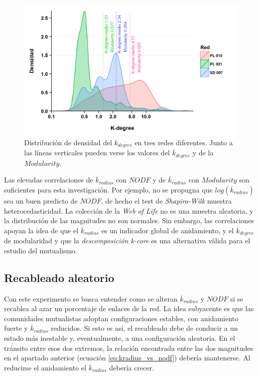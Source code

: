 \begin{figure}[h!]
\centering
\includegraphics[scale=0.85]{ESTATICA_density_plots.png}
\caption {Distribución de densidad del $k_{degree}$ en tres redes diferentes. Junto a las líneas verticales pueden verse los valores del $\overline {k}_{degree}$ y de la $Modularity$.}
\label{fig:ESTATICA_density_plots}
\end{figure}

Las elevadas correlaciones de $\overline {k}_{radius}$ con $NODF$ y de $\overline {k}_{radius}$ con $Modularity$ son suficientes para esta investigación. Por ejemplo, no se propugna que $log(\overline {k}_{radius})$ sea un buen predicto de $NODF$, de hecho el test de \textit{Shapiro-Wilk} muestra heterocedasticidad. La colección de la \textit{Web of Life} no es una muestra aleatoria, y la distribución de las magnitudes no son normales. Sin embargo, las correlaciones apoyan la idea de que el $\overline {k}_{radius}$ es un indicador global de anidamiento, y el $\overline {k}_{degree}$ de modularidad y que la \textit{descomposición k-core} es una alternativa válida para el estudio del mutualismo.

\subsection{Recableado aleatorio}

Con este experimento se busca entender como se alteran $\overline {k}_{radius}$ y $NODF$ si se recablea al azar un porcentaje de enlaces de la red. La idea subyacente es que las comunidades mutualistas adoptan configuraciones estables, con anidamiento fuerte y $\overline {k}_{radius}$ reducidos. Si esto es así, el recableado debe de conducir a un estado más inestable y, eventualmente, a una configuración aleatoria. En el tránsito entre esos dos extremos, la relación encontrada entre las dos magnitudes en el apartado anterior (ecuación \ref{eq:kradius_vs_nodf}) debería mantenerse. Al reducirse el anidamiento el $\overline {k}_{radius}$ debería crecer.



